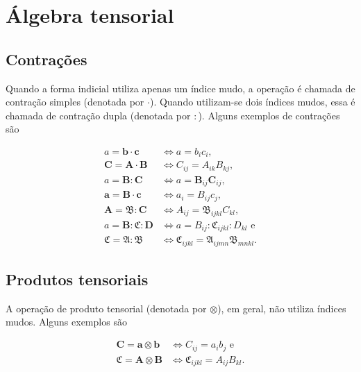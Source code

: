 \documentclass[_ArquivoPrincipal.tex]{subfiles}
\begin{document}
\chapter{Álgebra tensorial}\label{ch:algebra}

\section{Contrações}

Quando a forma indicial utiliza apenas um índice mudo, a operação é chamada de
	{contração simples} (denotada por $\cdot$). Quando utilizam-se dois
índices
mudos, essa é chamada de {contração dupla} (denotada por $:$). Alguns exemplos
de contrações são

\begin{align}
	a = \mathbf{b}\cdot\mathbf{c}                       & \iff
	a=b_{i}c_i  ,                                                   \\
	\mathbf{C}=\mathbf{A}\cdot\mathbf{B}                & \iff
	{C}_{ij}={A}_{ik}{B}_{kj} , \label{eq:cont2x2}                  \\
	a=\mathbf{B}:\mathbf{C}                             & \iff
	a=\mathbf{B}_{ij}\mathbf{C}_{ij} ,                              \\
	\mathbf{a}=\mathbf{B}\cdot\mathbf{c}                & \iff
	a_i=B_{ij}c_j ,                                                 \\
	\mathbf{A} = \boldsymbol{\mathfrak{B}}:\mathbf{C}   & \iff
	A_{ij}=\mathfrak{B}_{ijkl}C_{kl} ,                              \\
	a = \mathbf{B}:\boldsymbol{\mathfrak{C}}:\mathbf{D} & \iff  a =
	B_{ij}:{\mathfrak{C}}_{ijkl}:{D}_{kl} \text{ e}                 \\
	\mathfrak{C}=\mathfrak{A}:\mathfrak{B}              & \iff
	\mathfrak{C}_{ijkl}=\mathfrak{A}_{ijmn}\mathfrak{B}_{mnkl}
	.\label{eq:cont4x4}
\end{align}

\section{Produtos tensoriais}

A operação de produto tensorial (denotada por $\otimes$), em geral, não utiliza
índices mudos. Alguns exemplos são

\begin{align}
	\mathbf{C}=\mathbf{a}\otimes\mathbf{b}                 & \iff
	{C}_{ij}={a}_{i}{b}_{j} \text{	e}
	\\
	\boldsymbol{\mathfrak{C}}=\mathbf{A}\otimes \mathbf{B} & \iff
	\mathfrak{C}_{ijkl}={A}_{ij}{B}_{kl} \text{.}
\end{align}
\end{document}
